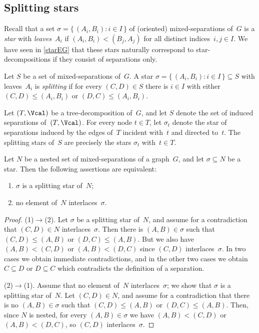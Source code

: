 \documentclass{aic}
\newcommand{\se}{\subseteq}
\theoremstyle{plain}
\theoremstyle{definition}
\theoremstyle{plain}
\theoremstyle{plain}
\renewcommand{\le}{\leqslant}
\begin{document}
\subsection{Splitting stars}

Recall that a set $\sigma=\{\,(A_i,B_i): i\in I\,\}$ of (oriented) mixed-separations of~$G$ is a \emph{star} with \emph{leaves}~$A_i$ if $(A_i,B_i)< (B_j,A_j)$ for all distinct indices~$i,j\in I$.
We have seen in \autoref{starEG} that these stars naturally correspond to star-decompositions if they consist of separations only.

Let $S$ be a set of mixed-separations of~$G$.
A star $\sigma=\{\,(A_i,B_i): i\in I\,\}\se S$ with leaves~$A_i$ is \emph{splitting} if for every $(C,D)\in S$ there is $i\in I$ with either $(C,D)\le (A_i,B_i)$ or $(D,C)\le (A_i,B_i)$.

\begin{eg}
Let $(T,\Vcal)$ be a tree-decomposition of~$G$, and let $S$ denote the set of induced separations of~$(T,\Vcal)$.
For every node $t\in T$, let $\sigma_t$ denote the star of separations induced by the edges of~$T$ incident with~$t$ and directed to~$t$.
The splitting stars of~$S$ are precisely the stars $\sigma_t$ with~$t\in T$.
\end{eg}

\begin{lem}\label{splitVsInterlace}
Let $N$ be a nested set of mixed-separations of a graph~$G$, and let $\sigma\se N$ be a star.
Then the following assertions are equivalent:
\begin{enumerate}
    \item $\sigma$ is a splitting star of~$N$;
    \item no element of~$N$ interlaces~$\sigma$.
\end{enumerate}
\end{lem}
\begin{proof}
(1)$\to$(2). 
Let $\sigma$ be a splitting star of~$N$, and assume for a contradiction that $(C,D)\in N$ interlaces~$\sigma$.
Then there is $(A,B)\in\sigma$ such that $(C,D)\le (A,B)$ or $(D,C)\le (A,B)$. But we also have $(A,B)<(C,D)$ or $(A,B)<(D,C)$ since $(C,D)$ interlaces~$\sigma$.
In two cases we obtain immediate contradictions, and in the other two cases we obtain $C\se D$ or $D\se C$ which contradicts the definition of a separation.

(2)$\to$(1). Assume that no element of~$N$ interlaces~$\sigma$; we show that $\sigma$ is a splitting star of~$N$.
Let $(C,D)\in N$, and assume for a contradiction that there is no $(A,B)\in\sigma$ such that $(C,D)\le (A,B)$ or $(D,C)\le (A,B)$.
Then, since $N$ is nested, for every $(A,B)\in\sigma$ we have $(A,B)< (C,D)$ or $(A,B)<(D,C)$, so $(C,D)$ interlaces~$\sigma$.
\end{proof}
\end{document}
